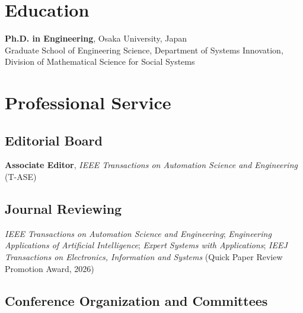 \documentclass[11pt,a4paper]{article}
\newlength{\datecol}
\newenvironment{cvlist}{%
  \begin{list}{}{%
    \setlength{\leftmargin}{\datecol}%
    \setlength{\labelwidth}{\datecol}%
    \setlength{\labelsep}{0pt}%
    \setlength{\itemsep}{3pt}%
    \setlength{\parsep}{0pt}%
    \setlength{\topsep}{2pt}%
    \renewcommand{\makelabel}[1]{##1\hfil}}%
  \raggedright}%
  {\end{list}}
\begin{document}
\section{Education}

\begin{cvlist}
\item[2021] \textbf{Ph.D. in Engineering}, Osaka University, Japan\\
  Graduate School of Engineering Science, Department of Systems Innovation,
  Division of Mathematical Science for Social Systems
\end{cvlist}

\section{Professional Service}

\subsection*{Editorial Board}

\begin{cvlist}
\item[2027--] \textbf{Associate Editor}, \textit{IEEE Transactions on
  Automation Science and Engineering} (T-ASE)
\end{cvlist}

\subsection*{Journal Reviewing}

\begin{cvlist}
\item[] \textit{IEEE Transactions on Automation Science and Engineering};
  \textit{Engineering Applications of Artificial Intelligence};
  \textit{Expert Systems with Applications};
  \textit{IEEJ Transactions on Electronics, Information and Systems}
  (Quick Paper Review Promotion Award, 2026)
\end{cvlist}

\subsection*{Conference Organization and Committees}
\end{document}
